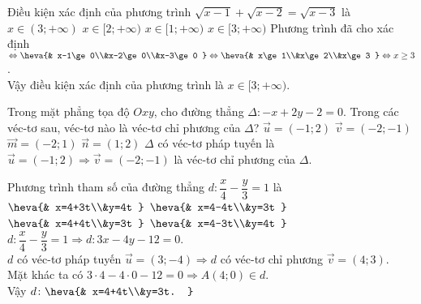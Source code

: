 \begin{ex}%
	Điều kiện xác định của phương trình $\sqrt{x-1}+\sqrt{x-2}=\sqrt{x-3}$ là
	\choice 
	{$x\in (3;+\infty )$} 
	{$x\in [2;+\infty )$}
	{$x\in [1;+\infty )$} 
	{\True $x\in [3;+\infty )$}
	\loigiai
	{
		Phương trình đã cho xác định $\Leftrightarrow\heva{& x-1\ge 0\\&x-2\ge 0\\&x-3\ge 0 }\Leftrightarrow \heva{& x\ge 1\\&x\ge 2\\&x\ge 3 }\Leftrightarrow x\ge 3$.\\
		Vậy điều kiện xác định của phương trình là $x\in [3;+\infty )$.
	}
\end{ex}

\begin{ex}%
	Trong mặt phẳng tọa độ $Oxy$, cho đường thẳng $\Delta\colon -x+2y-2=0$. Trong các véc-tơ sau, véc-tơ nào là véc-tơ chỉ phương của $\Delta$?
	\choice 
	{$\overrightarrow{u}=(-1;2)$} 
	{\True $\overrightarrow{v}=(-2;-1)$}
	{$\overrightarrow{m}=(-2;1)$} 
	{$\overrightarrow{n}=(1;2)$}
	\loigiai
	{
		$\Delta$ có véc-tơ pháp tuyến là $\overrightarrow{u}=(-1;2)\Rightarrow \overrightarrow{v}=(-2;-1)$ là véc-tơ chỉ phương của $\Delta$.
	}
\end{ex}

\begin{ex}%
	Phương trình tham số của đường thẳng $d\colon \dfrac{x}{4}-\dfrac{y}{3}=1$ là
	\choice 
	{$\heva{& x=4+3t\\&y=4t }$} 
	{$\heva{& x=4-4t\\&y=3t }$}
	{\True $\heva{& x=4+4t\\&y=3t }$} 
	{$\heva{& x=4-3t\\&y=4t }$}
	\loigiai
	{
		$d\colon \dfrac{x}{4}-\dfrac{y}{3}=1\Rightarrow d\colon 3x-4y-12=0$.\\
		$d$ có véc-tơ pháp tuyến $\overrightarrow{u}=(3;-4)\Rightarrow d$ có véc-tơ chỉ phương $\overrightarrow{v}=(4;3)$.\\
		Mặt khác ta có $3\cdot 4-4\cdot 0-12=0\Rightarrow A(4;0)\in d$.\\
		Vậy $d\colon\heva{& x=4+4t\\&y=3t. }$
	}
\end{ex}

